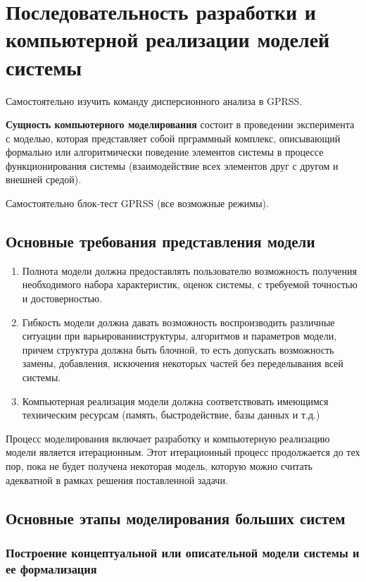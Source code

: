 \section{Последовательность разработки и компьютерной реализации моделей системы}

Самостоятельно изучить команду дисперсионного анализа в GPRSS.

\textbf{Сущность компьютерного моделирования} состоит в проведении эксперимента с моделью, которая представляет собой прграммный комплекс, описывающий формально или алгоритмически поведение элементов системы в процессе функционирования системы (взаимодействие всех элементов друг с другом и внешней средой).

Самостоятельно блок-тест GPRSS (все возможные режимы).

\subsection{Основные требования представления модели}

\begin{enumerate}
    \item Полнота модели должна предоставлять пользователю возможность получения необходимого набора характеристик, оценок системы, с требуемой точностью и достоверностью.
    \item Гибкость модели должна давать возможность воспроизводить различные ситуации при варьированииструктуры, алгоритмов и параметров модели, причем структура должна быть блочной, то есть допускать возможность замены, добавления, искючения некоторых частей без переделывания всей системы.
    \item Компьютерная реализация модели должна соответствовать имеющимся техническим ресурсам (память, быстродействие, базы данных и т.д.)
\end{enumerate}

Процесс моделирования включает разработку и компьютерную реализацию модели является итерационным. Этот итерационный процесс продолжается до тех пор, пока не будет получена некоторая модель, которую можно считать адекватной в рамках решения поставленной задачи.

\subsection{Основные этапы моделирования больших систем}

\subsubsection{Построение концептуальной или описательной модели системы и ее формализация}

